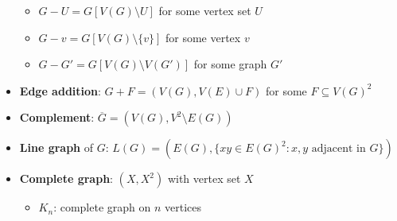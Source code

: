 \begin{itemize}
  \begin{itemize}
    \item $ G - U = G[V(G) \setminus U] $ for some vertex set $ U $
    \item $ G - v = G[V(G) \setminus \{ v \}] $ for some vertex $ v $ 
    \item $ G - G' = G[V(G) \setminus V(G')] $ for some graph $ G' $
  \end{itemize}
  \item \textbf{Edge addition}: $ G + F = (V(G), V(E) \cup F) $ for some $ F \subseteq V(G)^2 $
  \item \textbf{Complement}: $ \overline{G} = (V(G), V^2 \setminus E(G)) $
  \item \textbf{Line graph} of $ G $: $ L(G) = (E(G), \{ xy \in E(G)^2 : x,y \text{ adjacent in } G \}) $ 
  \item \textbf{Complete graph}: $ (X, X^2) $ with vertex set $ X $
  \begin{itemize}
    \item $ K_n $: complete graph on $ n $ vertices 
  \end{itemize}
\end{itemize}

